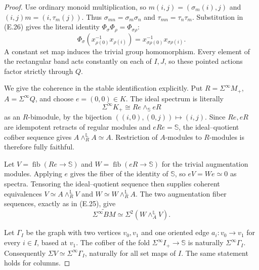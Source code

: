 \begin{proof}
Use ordinary monoid multiplication, so $m(i,j)=(\sigma_m(i),j)$
and $(i,j)m=(i,\tau_m(j))$.  Thus
$\sigma_{mn}=\sigma_m\sigma_n$ and
$\tau_{mn}=\tau_n\tau_m$.  Substitution in (E.26) gives the literal
identity $\Phi_\sigma\Phi_\rho=\Phi_{\sigma\rho}$:
\[
 \Phi_\sigma(x_{\rho(0)}^{-1}x_{\rho(i)})
 =x_{\sigma\rho(0)}^{-1}x_{\sigma\rho(i)}.
\]
A constant set map induces the trivial group homomorphism.  Every
element of the rectangular band acts constantly on each of $I,J$,
so these pointed actions factor strictly through $Q$.

We give the coherence in the stable identification explicitly.
Put $R=\Sigma^\infty M_+$, $A=\Sigma^\infty Q$, and choose
$e=(0,0)\in K$.  The ideal spectrum is literally
\[
 \Sigma^\infty K_+\cong Re\wedge_{\mathbb S}eR
\]
as an $R$-bimodule, by the bijection
$((i,0),(0,j))\mapsto(i,j)$.  Since $Re,eR$ are idempotent retracts
of regular modules and $eRe=\mathbb S$, the ideal--quotient cofiber
sequence gives
$A\wedge_R^{\mathbb L}A\simeq A$.  Restriction of $A$-modules to
$R$-modules is therefore fully faithful.

Let $V=\operatorname{fib}(Re\to\mathbb S)$ and
$W=\operatorname{fib}(eR\to\mathbb S)$ for the trivial augmentation
modules.  Applying $e$ gives the fiber of the identity of $\mathbb S$,
so $eV=We\simeq0$ as spectra.  Tensoring the ideal--quotient sequence
then supplies coherent equivalences
$V\simeq A\wedge_R^{\mathbb L}V$ and
$W\simeq W\wedge_R^{\mathbb L}A$.  The two augmentation fiber
sequences, exactly as in (E.25), give
\[
 \widetilde{\Sigma^\infty BM}
 \simeq\Sigma^2(W\wedge_A^{\mathbb L}V).               \tag{E.28}
\]

Let $\Gamma_I$ be the graph with two vertices $v_0,v_1$ and one
oriented edge $a_i:v_0\to v_1$ for every $i\in I$, based at $v_1$.
The cofiber of the fold $\Sigma^\infty I_+\to\mathbb S$ is naturally
$\Sigma^\infty\Gamma_I$.  Consequently
$\Sigma V\simeq\Sigma^\infty\Gamma_I$, naturally for all set maps
of $I$.  The same statement holds for columns.


\end{proof}
